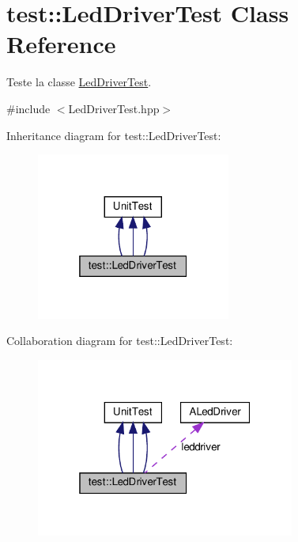 \hypertarget{classtest_1_1LedDriverTest}{}\section{test\+:\+:Led\+Driver\+Test Class Reference}
\label{classtest_1_1LedDriverTest}


Teste la classe \hyperlink{classtest_1_1LedDriverTest}{Led\+Driver\+Test}.  




{\ttfamily \#include $<$Led\+Driver\+Test.\+hpp$>$}



Inheritance diagram for test\+:\+:Led\+Driver\+Test\+:
\nopagebreak
\begin{figure}[H]
\begin{center}
\leavevmode
\includegraphics[width=181pt]{classtest_1_1LedDriverTest__inherit__graph}
\end{center}
\end{figure}


Collaboration diagram for test\+:\+:Led\+Driver\+Test\+:
\nopagebreak
\begin{figure}[H]
\begin{center}
\leavevmode
\includegraphics[width=241pt]{classtest_1_1LedDriverTest__coll__graph}
\end{center}
\end{figure}
